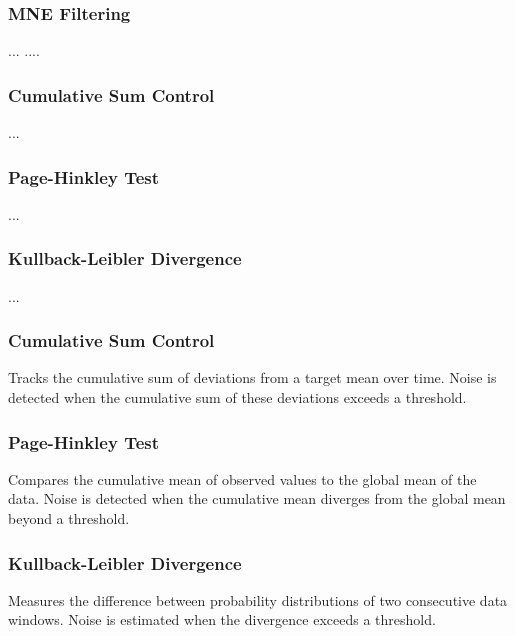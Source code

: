 \subsubsection{MNE Filtering}
...
....

\subsubsection{Cumulative Sum Control}
...

\subsubsection{Page-Hinkley Test}
...

\subsubsection{Kullback-Leibler Divergence}
...








\subsubsection{Cumulative Sum Control}
Tracks the cumulative sum of deviations from a target mean over time. Noise is detected when the cumulative sum of these deviations exceeds a threshold.

\subsubsection{Page-Hinkley Test}
Compares the cumulative mean of observed values to the global mean of the data. Noise is detected when the cumulative mean diverges from the global mean beyond a threshold.

\subsubsection{Kullback-Leibler Divergence}
Measures the difference between probability distributions of two consecutive data windows. Noise is estimated when the divergence exceeds a threshold.







